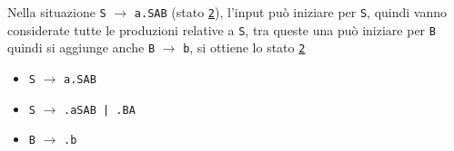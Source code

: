 Nella situazione \texttt{S} $\rightarrow$ \texttt{a.SAB} (stato \texttt{\underline{2}}), l'input può iniziare per \texttt{S}, quindi vanno considerate tutte le produzioni relative a \texttt{S}, tra queste una può iniziare per \texttt{B} quindi si aggiunge anche \texttt{B} $\rightarrow$ \texttt{b}, si ottiene lo stato \texttt{\underline{2}}
\begin{itemize}
    \item \texttt{S} $\rightarrow$ \texttt{a.SAB}
    \item \texttt{S} $\rightarrow$ \texttt{.aSAB | .BA}
    \item \texttt{B} $\rightarrow$ \texttt{.b}
\end{itemize}
\setlist{}




























































